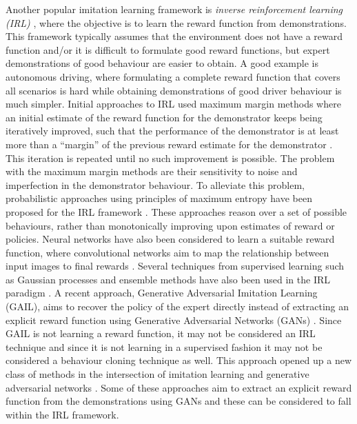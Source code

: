 \documentclass[jair, twoside,11pt,theapa]{article}
\begin{document}
Another popular imitation learning framework is \textit{inverse reinforcement learning (IRL)} \citep{ng2000algorithms}, where the objective is to learn the reward function from demonstrations. This framework typically assumes that the environment does not have a reward function and/or it is difficult to formulate good reward functions, but expert demonstrations of good behaviour are easier to obtain. A good example is autonomous driving, where formulating a complete reward function that covers all scenarios is hard while obtaining demonstrations of good driver behaviour is much simpler.   Initial approaches to IRL used maximum margin methods where an initial estimate of the reward function for the demonstrator keeps being iteratively improved, such that the performance of the demonstrator is at least more than a ``margin'' of the previous reward estimate for the demonstrator \citep{abbeel2004apprenticeship, ratliff2006maximum}. This iteration is repeated until no such improvement is possible. The problem with the maximum margin methods are their sensitivity to noise and imperfection in the demonstrator behaviour. To alleviate this problem, probabilistic approaches using principles of maximum entropy have been proposed for the IRL framework \citep{ziebart2008maximum, boularias2011relative}. These approaches reason over a set of possible behaviours, rather than monotonically improving upon estimates of reward or policies.  Neural networks have also been considered to learn a suitable reward function, where convolutional networks aim to map the relationship between input images to final rewards \citep{wulfmeier2015maximum}. Several techniques from supervised learning such as Gaussian processes \citep{rasmussen2003gaussian} and ensemble methods \citep{dietterich2000ensemble} have also been used in the IRL paradigm \citep{levine2011nonlinear, ratliff2006boosting}. A recent approach, Generative Adversarial Imitation Learning (GAIL), aims to recover the policy of the expert directly instead of extracting an explicit reward function using Generative Adversarial Networks (GANs) \citep{ho2016generative}. Since GAIL is not learning a reward function, it may not be considered an IRL technique and since it is not learning in a supervised fashion it may not be considered a behaviour cloning technique as well. This approach opened up a new class of methods in the intersection of imitation learning and generative adversarial networks \citep{miyato2018spectral, kuefler2017imitating}. Some of these approaches aim to extract an explicit reward function from the demonstrations using GANs \citep{finn2016connection, fu2018learning} and these can be considered to fall within the IRL framework.
\end{document}

